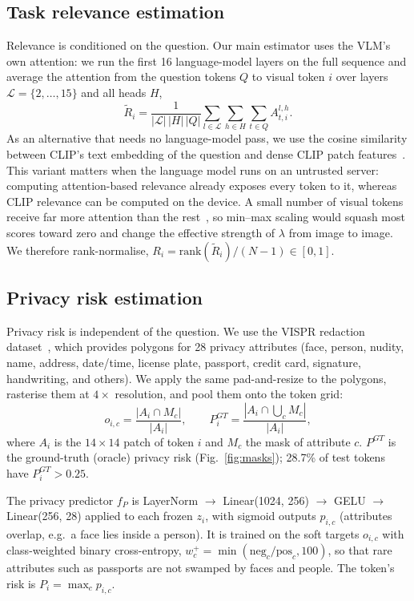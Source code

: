\documentclass{article}
\begin{document}
\subsection{Task relevance estimation}
Relevance is conditioned on the question. Our main estimator uses the VLM's own attention: we run the first 16 language-model layers on the full
sequence and average the attention from the question tokens $Q$ to visual token $i$ over layers $\mathcal{L}=\{2,\dots,15\}$ and all heads $H$,
\begin{equation}
\tilde R_i = \frac{1}{|\mathcal{L}|\,|H|\,|Q|}\sum_{l\in\mathcal{L}}\sum_{h\in H}\sum_{t\in Q} A^{l,h}_{t,i}.
\end{equation}
As an alternative that needs no language-model pass, we use the cosine similarity between CLIP's text embedding of the question and dense
CLIP patch features~\cite{zhou2022maskclip}. This variant matters when the language model runs on an untrusted server: computing attention-based
relevance already exposes every token to it, whereas CLIP relevance can be computed on the device. A small number of visual tokens receive far more
attention than the rest~\cite{darcet2024registers}, so min--max scaling would squash most scores toward zero and change the effective strength of
$\lambda$ from image to image. We therefore rank-normalise, $R_i=\mathrm{rank}(\tilde R_i)/(N-1)\in[0,1]$.

\subsection{Privacy risk estimation}
Privacy risk is independent of the question. We use the VISPR redaction dataset~\cite{orekondy2018connecting}, which provides polygons for 28
privacy attributes (face, person, nudity, name, address, date/time, license plate, passport, credit card, signature, handwriting, and others).
We apply the same pad-and-resize to the polygons, rasterise them at $4\times$ resolution, and pool them onto the token grid:
\begin{equation}
o_{i,c} = \frac{|A_i\cap M_c|}{|A_i|}, \qquad P^{GT}_i = \frac{|A_i\cap \bigcup_c M_c|}{|A_i|},
\end{equation}
where $A_i$ is the $14{\times}14$ patch of token $i$ and $M_c$ the mask of attribute $c$. $P^{GT}$ is the ground-truth (oracle) privacy risk
(Fig.~\ref{fig:masks}); 28.7\% of test tokens have $P^{GT}_i>0.25$.

The privacy predictor $f_P$ is LayerNorm $\to$ Linear(1024, 256) $\to$ GELU $\to$ Linear(256, 28) applied to each frozen $z_i$, with sigmoid
outputs $p_{i,c}$ (attributes overlap, e.g.\ a face lies inside a person). It is trained on the soft targets $o_{i,c}$ with class-weighted binary
cross-entropy, $w^+_c=\min(\mathrm{neg}_c/\mathrm{pos}_c,100)$, so that rare attributes such as passports are not swamped by faces and people.
The token's risk is $P_i=\max_c p_{i,c}$.
\end{document}
